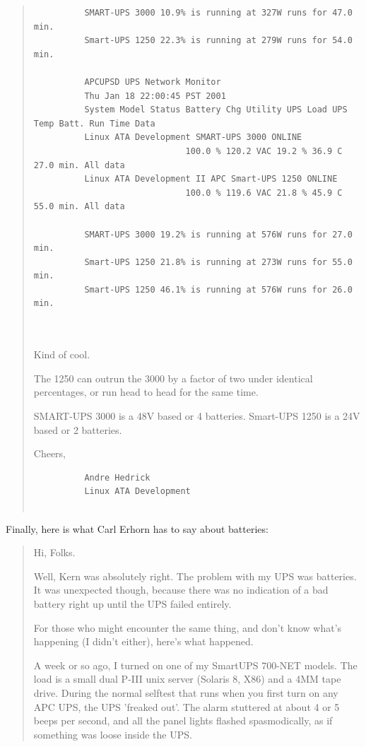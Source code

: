 {{{{{{\begin{quote}
\footnotesize
\begin{verbatim}
          SMART-UPS 3000 10.9% is running at 327W runs for 47.0 min.
          Smart-UPS 1250 22.3% is running at 279W runs for 54.0 min.
          
          APCUPSD UPS Network Monitor
          Thu Jan 18 22:00:45 PST 2001
          System Model Status Battery Chg Utility UPS Load UPS Temp Batt. Run Time Data
          Linux ATA Development SMART-UPS 3000 ONLINE
                              100.0 % 120.2 VAC 19.2 % 36.9 C 27.0 min. All data
          Linux ATA Development II APC Smart-UPS 1250 ONLINE
                              100.0 % 119.6 VAC 21.8 % 45.9 C 55.0 min. All data
          
          SMART-UPS 3000 19.2% is running at 576W runs for 27.0 min.
          Smart-UPS 1250 21.8% is running at 273W runs for 55.0 min.
          Smart-UPS 1250 46.1% is running at 576W runs for 26.0 min.
          
     
\end{verbatim}
\normalsize

Kind of cool.  

The 1250 can outrun the 3000 by a factor of two under identical percentages,
or run head to head for the same time.  

SMART-UPS 3000 is a 48V based or 4 batteries.  Smart-UPS 1250 is a 24V based
or 2 batteries.  

Cheers,  

\footnotesize
\begin{verbatim}
          Andre Hedrick
          Linux ATA Development
     
\end{verbatim}
\normalsize

\end{quote}

Finally, here is what Carl Erhorn has to say about batteries:  

\begin{quote}

Hi, Folks.  

Well, Kern was absolutely right. The problem with my UPS was batteries. It was
unexpected though, because there was no indication of a bad battery right up
until the UPS failed entirely.  

For those who might encounter the same thing, and don't know what's happening
(I didn't either), here's what happened.  

A week or so ago, I turned on one of my SmartUPS 700-NET models. The load is a
small dual P-III unix server (Solaris 8, X86) and a 4MM tape drive. During the
normal selftest that runs when you first turn on any APC UPS, the UPS 'freaked
out'. The alarm stuttered at about 4 or 5 beeps per second, and all the panel
lights flashed spasmodically, as if something was loose inside the UPS.  


\end{quote}}}}}}}
